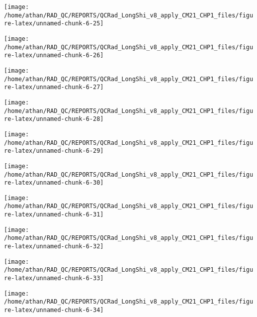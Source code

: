 \documentclass[
  10pt,
  a4paper,oneside]{article}
\begin{document}
\begin{center}\texttt{[image: /home/athan/RAD\_QC/REPORTS/QCRad\_LongShi\_v8\_apply\_CM21\_CHP1\_files/figure-latex/unnamed-chunk-6-25]} \end{center}

\begin{center}\texttt{[image: /home/athan/RAD\_QC/REPORTS/QCRad\_LongShi\_v8\_apply\_CM21\_CHP1\_files/figure-latex/unnamed-chunk-6-26]} \end{center}

\begin{center}\texttt{[image: /home/athan/RAD\_QC/REPORTS/QCRad\_LongShi\_v8\_apply\_CM21\_CHP1\_files/figure-latex/unnamed-chunk-6-27]} \end{center}

\begin{center}\texttt{[image: /home/athan/RAD\_QC/REPORTS/QCRad\_LongShi\_v8\_apply\_CM21\_CHP1\_files/figure-latex/unnamed-chunk-6-28]} \end{center}

\begin{center}\texttt{[image: /home/athan/RAD\_QC/REPORTS/QCRad\_LongShi\_v8\_apply\_CM21\_CHP1\_files/figure-latex/unnamed-chunk-6-29]} \end{center}

\begin{center}\texttt{[image: /home/athan/RAD\_QC/REPORTS/QCRad\_LongShi\_v8\_apply\_CM21\_CHP1\_files/figure-latex/unnamed-chunk-6-30]} \end{center}

\begin{center}\texttt{[image: /home/athan/RAD\_QC/REPORTS/QCRad\_LongShi\_v8\_apply\_CM21\_CHP1\_files/figure-latex/unnamed-chunk-6-31]} \end{center}

\begin{center}\texttt{[image: /home/athan/RAD\_QC/REPORTS/QCRad\_LongShi\_v8\_apply\_CM21\_CHP1\_files/figure-latex/unnamed-chunk-6-32]} \end{center}

\begin{center}\texttt{[image: /home/athan/RAD\_QC/REPORTS/QCRad\_LongShi\_v8\_apply\_CM21\_CHP1\_files/figure-latex/unnamed-chunk-6-33]} \end{center}

\begin{center}\texttt{[image: /home/athan/RAD\_QC/REPORTS/QCRad\_LongShi\_v8\_apply\_CM21\_CHP1\_files/figure-latex/unnamed-chunk-6-34]} \end{center}
\end{document}
